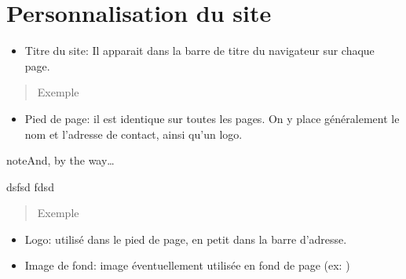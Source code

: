 \documentclass[letterpaper,10pt,english]{sphinxmanual}
\begin{document}
\section{Personnalisation du site}
\label{\detokenize{configurer:personnalisation-du-site}}\begin{itemize}
\item {} 
Titre du site: Il apparait dans la barre de titre du navigateur sur chaque page.

\end{itemize}
\begin{quote}\begin{description}
\item[{Exemple}] \leavevmode
{}

\end{description}\end{quote}
\begin{itemize}
\item {} 
Pied de page: il est identique sur toutes les pages. On y place généralement le nom et l’adresse de contact, ainsi qu’un logo.

\end{itemize}

\begin{sphinxadmonition}{note}{And, by the way…}

dsfsd
fdsd
\end{sphinxadmonition}






\begin{quote}\begin{description}
\item[{Exemple}] \leavevmode
{}

\end{description}\end{quote}
\begin{itemize}
\item {} 
Logo: utilisé dans le pied de page, en petit dans la barre d’adresse.

\item {} 
Image de fond: image éventuellement utilisée en fond de page (ex:  )

\end{itemize}
\end{document}
